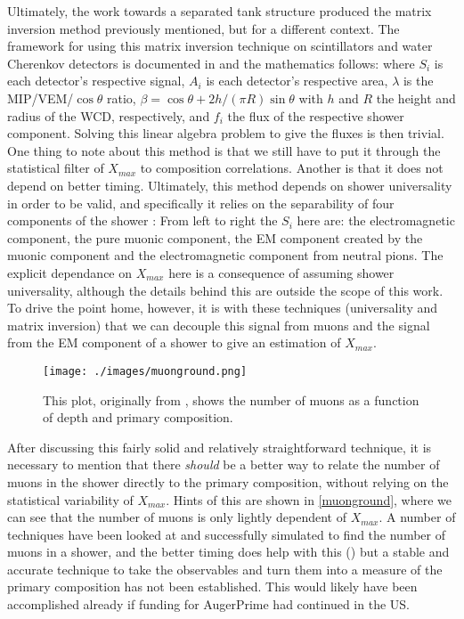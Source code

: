 Ultimately, the work towards a separated tank structure produced the matrix inversion method previously mentioned, but for a different context. The framework for using this matrix inversion technique on scintillators and water Cherenkov detectors is documented in \textcite{primepdr} and the mathematics follows:
where $S_i$ is each detector's respective signal, $A_i$ is each detector's respective area, $\lambda$ is the MIP/VEM/$\cos\theta$ ratio, $\beta=\cos\theta+2h/(\pi R)\sin\theta$ with $h$ and $R$ the height and radius of the WCD, respectively, and $f_i$ the flux of the respective shower component. Solving this linear algebra problem to give the fluxes is then trivial. One thing to note about this method is that we still have to put it through the statistical filter of $X_{max}$ to composition correlations. Another is that it does not depend on better timing. Ultimately, this method depends on shower universality in order to be valid, and specifically it relies on the separability of four components of the shower \cite{primepdr,univpart}:
From left to right the $S_i$ here are: the electromagnetic component, the pure muonic component, the EM component created by the muonic component and the electromagnetic component from neutral pions. The explicit dependance on $X_{max}$ here is a consequence of assuming shower universality, although the details behind this are outside the scope of this work. To drive the point home, however, it is with these techniques (universality and matrix inversion) that we can decouple this signal from muons and the signal from the EM component of a shower to give an estimation of $X_{max}$.
\begin{center}
\begin{figure}[H]
\texttt{[image: ./images/muonground.png]}
\caption[Muon Content vs. Primary Over Depth]{This plot, originally from \cite{primeuniv}, shows the number of muons as a function of depth and primary composition.}
\label{muonground}
\end{figure}
\end{center}
After discussing this fairly solid and relatively straightforward technique, it is necessary to mention that there \textit{should} be a better way to relate the number of muons in the shower directly to the primary composition, without relying on the statistical variability of $X_{max}$. Hints of this are shown in \autoref{muonground}, where we can see that the number of muons is only lightly dependent of $X_{max}$. A number of techniques have been looked at and successfully simulated to find the number of muons in a shower, and the better timing does help with this (\cite{mupart, primeuniv}) but a stable and accurate technique to take the observables and turn them into a measure of the primary composition has not been established. This would likely have been accomplished already if funding for AugerPrime had continued in the US.


